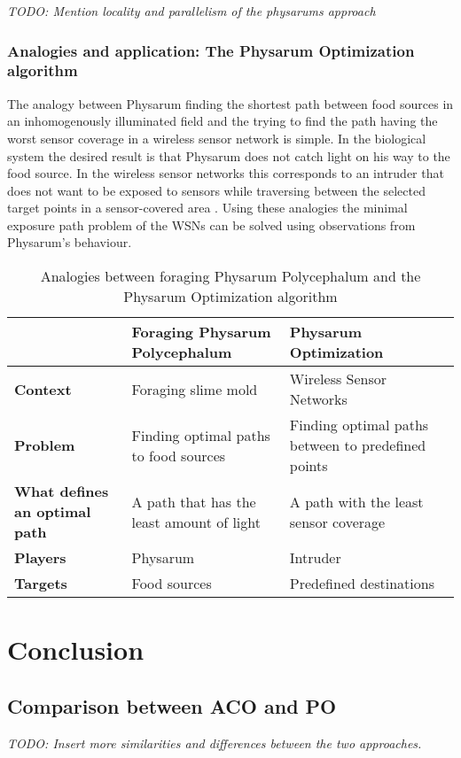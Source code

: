 \documentclass{IWORK2014}
\begin{document}
\textit{TODO: Mention locality and parallelism of the physarums approach}
\subsubsection{Analogies and application: The Physarum Optimization algorithm}
The analogy between Physarum finding the shortest path between food sources in an inhomogenously illuminated field and the trying to find the path having the worst sensor coverage in a wireless sensor network is simple. In the biological system the desired result is that Physarum does not catch light on his way to the food source. In the wireless sensor networks this corresponds to an intruder that does not want to be exposed to sensors while traversing between the selected target points in a sensor-covered area \cite{liu2012physarum}. Using these analogies the minimal exposure path problem of the WSNs can be solved using observations from Physarum's behaviour.

\begin{table}
	\begin{tabularx}{\linewidth}{|X|X|X|}
		\hline & \textbf{Foraging Physarum Polycephalum} & \textbf{Physarum Optimization} \\ \hline
		\textbf{Context} & Foraging slime mold & Wireless Sensor Networks \\ \hline
		\textbf{Problem} & Finding optimal paths to food sources & Finding optimal paths between to predefined points \\ \hline
		\textbf{What defines an optimal path} & A path that has the least amount of light & A path with the least sensor coverage \\ \hline
		\textbf{Players} & Physarum & Intruder \\ \hline
		\textbf{Targets} & Food sources & Predefined destinations \\ \hline
	\end{tabularx}
	\caption{Analogies between foraging Physarum Polycephalum and the Physarum Optimization algorithm}
	\label{tbl:analogies_physarum}
\end{table}

\section{Conclusion}

\subsection{Comparison between ACO and PO}
\textit{TODO: Insert more similarities and differences between the two approaches.}
\end{document}

